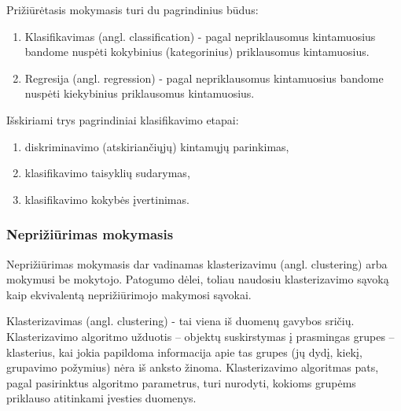 Prižiūrėtasis mokymasis turi du pagrindinius būdus:
\begin{enumerate}
  \item Klasifikavimas (angl. classification) - pagal nepriklausomus
  kintamuosius bandome nuspėti kokybinius (kategorinius) priklausomus kintamuosius. 
  \item Regresija (angl. regression) - pagal nepriklausomus kintamuosius bandome
  nuspėti kiekybinius priklausomus kintamuosius.
\end{enumerate}

Išskiriami trys pagrindiniai klasifikavimo etapai:
\begin{enumerate}
  \item diskriminavimo (atskiriančiųjų) kintamųjų parinkimas,
  \item klasifikavimo taisyklių sudarymas,
  \item klasifikavimo kokybės įvertinimas.
\end{enumerate}



\subsubsection{Neprižiūrimas mokymasis}

Neprižiūrimas mokymasis dar vadinamas klasterizavimu (angl. clustering) arba
mokymusi be mokytojo. Patogumo dėlei, toliau naudosiu klasterizavimo sąvoką kaip
ekvivalentą neprižiūrimojo makymosi sąvokai.


Klasterizavimas (angl. clustering) - tai viena iš duomenų gavybos sričių.
Klasterizavimo algoritmo užduotis – objektų suskirstymas  į prasmingas 
grupes – klasterius, kai jokia papildoma informacija apie tas grupes (jų dydį, kiekį, grupavimo požymius) nėra iš anksto žinoma.
%
% 
Klasterizavimo algoritmas pats, pagal pasirinktus algoritmo parametrus, turi nurodyti, kokioms 
grupėms priklauso atitinkami įvesties duomenys.\cite{martisiute08}


